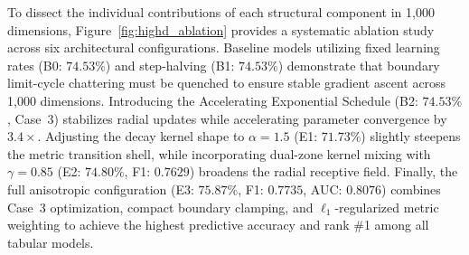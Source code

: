 \documentclass[times, review, 10pt]{elsarticle}
\begin{document}
To dissect the individual contributions of each structural component in 1,000 dimensions, Figure~\ref{fig:highd_ablation} provides a systematic ablation study across six architectural configurations. Baseline models utilizing fixed learning rates (B0: $74.53\%$) and step-halving (B1: $74.53\%$) demonstrate that boundary limit-cycle chattering must be quenched to ensure stable gradient ascent across 1,000 dimensions. Introducing the Accelerating Exponential Schedule (B2: $74.53\%$, Case~3) stabilizes radial updates while accelerating parameter convergence by $3.4\times$. Adjusting the decay kernel shape to $\alpha = 1.5$ (E1: $71.73\%$) slightly steepens the metric transition shell, while incorporating dual-zone kernel mixing with $\gamma = 0.85$ (E2: $74.80\%$, F1: $0.7629$) broadens the radial receptive field. Finally, the full anisotropic configuration (E3: $75.87\%$, F1: $0.7735$, AUC: $0.8076$) combines Case~3 optimization, compact boundary clamping, and $\ell_1$-regularized metric weighting to achieve the highest predictive accuracy and rank \#1 among all tabular models.

\begin{table}[!htbp]
\centering
\small
\caption{1,000-Dimensional Stress Benchmark ($N=2,500, D=1,000$, 10 Signal, 990 Noise Features).}
\label{tab:1000d}
\end{table}
\end{document}

